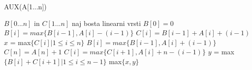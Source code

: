 \documentclass{article}
\begin{document}
\begin{algorithm}
\begin{algorithmic}[1]
\caption{AUX(A[1...n])}
\State $B[0...n]$ in $C[1...n]$ naj bosta linearni vrsti
\State $B[0] = 0$
        \State $B[i] = max\{ B[i-1], A[i] - (i-1) \}$
        \State $C[i] = B[i-1] + A[i] + (i-1)$
\EndFor
\State $x$ = max$\{ C[i]|1 \leq i \leq n \}$
        \State $B[i] = max\{ B[i-1], A[i] + (i-1) \}$
\EndFor
\State $C[n] = A[n] + 1$
        \State $C[i] = max\{ C[i+1], A[i] + n - (i-1) \}$
\EndFor
\State $y$ = max$\{ B[i] + C[i+1]| 1 \leq i \leq n-1 \}$
\State \Return max$\{ x,y \}$
\end{algorithmic}
\end{algorithm}
\end{document}
